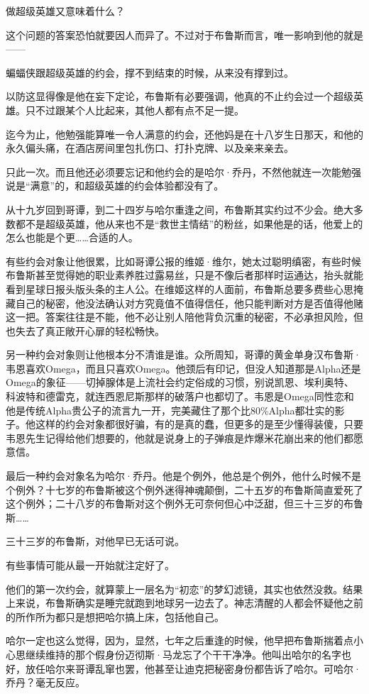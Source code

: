 \documentclass[../main]{subfiles}
\begin{document}
做超级英雄又意味着什么？

这个问题的答案恐怕就要因人而异了。不过对于布鲁斯而言，唯一影响到他的就是——

蝙蝠侠跟超级英雄的约会，撑不到结束的时候，从来没有撑到过。

以防这显得像是他在妄下定论，布鲁斯有必要强调，他真的不止约会过一个超级英雄。只不过跟某个人比起来，其他人都有点不足一提。

迄今为止，他勉强能算唯一令人满意的约会，还他妈是在十八岁生日那天，和他的永久偏头痛，在酒店房间里包扎伤口、打扑克牌、以及亲来亲去。

只此一次。而且他还必须要忘记和他约会的是哈尔·乔丹，不然他就连一次能勉强说是“满意”的，和超级英雄的约会体验都没有了。

从十九岁回到哥谭，到二十四岁与哈尔重逢之间，布鲁斯其实约过不少会。绝大多数都不是超级英雄，他从来也不是“救世主情结”的粉丝，如果他是的话，他爱上的怎么也能是个更……合适的人。

有些约会对象让他很累，比如哥谭公报的维姬·维尔，她太过聪明缜密，有些时候布鲁斯甚至觉得她的职业素养胜过露易丝，只是不像后者那样时运通达，抬头就能看到星球日报头版头条的主人公。在维姬这样的人面前，布鲁斯总要多费些心思掩藏自己的秘密，他没法确认对方究竟值不值得信任，他只能判断对方是否值得他赌这一把。答案往往是不能，他不必让别人陪他背负沉重的秘密，不必承担风险，但也失去了真正敞开心扉的轻松畅快。

另一种约会对象则让他根本分不清谁是谁。众所周知，哥谭的黄金单身汉布鲁斯·韦恩喜欢Omega，而且只喜欢Omega。他颈后有印记，但没人知道那是Alpha还是Omega的象征——切掉腺体是上流社会约定俗成的习惯，别说凯恩、埃利奥特、科波特和德雷克，就连西恩尼斯那样的破落户也都切了。韦恩是Omega同性恋和他是传统Alpha贵公子的流言九一开，完美藏住了那个比80\%Alpha都壮实的影子。他这样的约会对象都很好骗，有的是真的蠢，但更多的是至少懂得装傻，只要韦恩先生记得给他们想要的，他就是说身上的子弹痕是炸爆米花崩出来的他们都愿意信。

最后一种约会对象名为哈尔·乔丹。他是个例外，他总是个例外，他什么时候不是个例外？十七岁的布鲁斯被这个例外迷得神魂颠倒，二十五岁的布鲁斯简直爱死了这个例外；二十八岁的布鲁斯对这个例外无可奈何但心中泛甜，但三十三岁的布鲁斯……

三十三岁的布鲁斯，对他早已无话可说。

有些事情可能从最一开始就注定好了。

他们的第一次约会，就算蒙上一层名为“初恋”的梦幻滤镜，其实也依然没救。结果上来说，布鲁斯确实是睡完就跑到地球另一边去了。神志清醒的人都会怀疑他之前的所作所为都只是想把哈尔搞上床，包括他自己。

哈尔一定也这么觉得，因为，显然，七年之后重逢的时候，他早把布鲁斯揣着点小心思继续维持的那个假身份迈彻斯·马龙忘了个干干净净。他叫出哈尔的名字也好，放任哈尔来哥谭乱窜也罢，他甚至让迪克把秘密身份都告诉了哈尔。可哈尔·乔丹？毫无反应。
\end{document}
